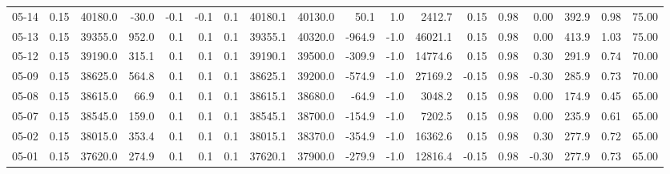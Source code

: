 \begin{threeparttable}
{\begin{tabular}{lrrrrrrrrrrrrrrrrr}
  05-14 &     0.15 & 40180.0 &             -30.0 &              -0.1 &               -0.1 &                0.1 & 40180.1 & 40130.0 &       50.1 &                      1.0 &              2412.7 &       0.15 &      0.98 &           0.00 &            392.9 &            0.98 &                  75.00 \\
  05-13 &     0.15 & 39355.0 &             952.0 &               0.1 &                0.1 &                0.1 & 39355.1 & 40320.0 &     -964.9 &                     -1.0 &             46021.1 &       0.15 &      0.98 &           0.00 &            413.9 &            1.03 &                  75.00 \\
  05-12 &     0.15 & 39190.0 &             315.1 &               0.1 &                0.1 &                0.1 & 39190.1 & 39500.0 &     -309.9 &                     -1.0 &             14774.6 &       0.15 &      0.98 &           0.30 &            291.9 &            0.74 &                  70.00 \\
  05-09 &     0.15 & 38625.0 &             564.8 &               0.1 &                0.1 &                0.1 & 38625.1 & 39200.0 &     -574.9 &                     -1.0 &             27169.2 &      -0.15 &      0.98 &          -0.30 &            285.9 &            0.73 &                  70.00 \\
  05-08 &     0.15 & 38615.0 &              66.9 &               0.1 &                0.1 &                0.1 & 38615.1 & 38680.0 &      -64.9 &                     -1.0 &              3048.2 &       0.15 &      0.98 &           0.00 &            174.9 &            0.45 &                  65.00 \\
  05-07 &     0.15 & 38545.0 &             159.0 &               0.1 &                0.1 &                0.1 & 38545.1 & 38700.0 &     -154.9 &                     -1.0 &              7202.5 &       0.15 &      0.98 &           0.00 &            235.9 &            0.61 &                  65.00 \\
  05-02 &     0.15 & 38015.0 &             353.4 &               0.1 &                0.1 &                0.1 & 38015.1 & 38370.0 &     -354.9 &                     -1.0 &             16362.6 &       0.15 &      0.98 &           0.30 &            277.9 &            0.72 &                  65.00 \\
  05-01 &     0.15 & 37620.0 &             274.9 &               0.1 &                0.1 &                0.1 & 37620.1 & 37900.0 &     -279.9 &                     -1.0 &             12816.4 &      -0.15 &      0.98 &          -0.30 &            277.9 &            0.73 &                  65.00 \\

\end{tabular}}
\end{threeparttable}
